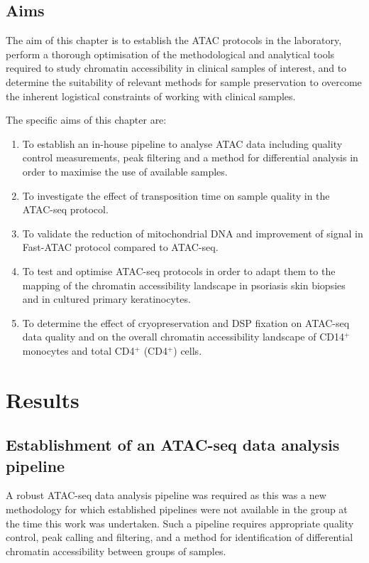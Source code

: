 \subsection{Aims}

The aim of this chapter is to establish the ATAC protocols in the laboratory, perform a thorough optimisation of the methodological and analytical tools required to study chromatin accessibility in clinical samples of interest, and to determine the suitability of relevant methods for sample preservation to overcome the inherent logistical constraints of working with clinical samples.
 
The specific aims of this chapter are:
 
\begin{enumerate}
\item To establish an in-house pipeline to analyse ATAC data including quality control measurements, peak filtering and a method for differential analysis in order to maximise the use of available samples.
 
\item To investigate the effect of transposition time on sample quality in the ATAC-seq protocol.
 
\item To validate the reduction of mitochondrial DNA and improvement of signal in Fast-ATAC protocol compared to ATAC-seq.
 
\item To test and optimise ATAC-seq protocols in order to adapt them to the mapping of the chromatin accessibility landscape in psoriasis skin biopsies and in cultured primary keratinocytes.

\item To determine the effect of cryopreservation and DSP fixation on ATAC-seq data quality and on the overall chromatin accessibility landscape of CD14$^+$ monocytes and total CD4$^+$ (CD4$^+$) cells.
\end{enumerate}



\section{Results}
%

\subsection{Establishment of an ATAC-seq data analysis pipeline}
A robust ATAC-seq data analysis pipeline was required as this was a new methodology \parencite{Buenrostro2013} for which established pipelines were not available in the group at the time this work was undertaken. Such a pipeline requires appropriate quality control, peak calling and filtering, and a method for identification of differential chromatin accessibility between groups of samples. 


